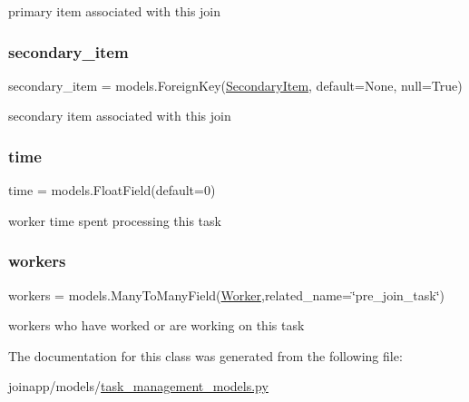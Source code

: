 primary item associated with this join 

\mbox{\label{classjoinapp_1_1models_1_1task__management__models_1_1_p_j_f_task_a0a9178a9cf48b964cab2025b9788a615}} 
\subsubsection{\texorpdfstring{secondary\_item}{secondary\_item}}
{\footnotesize\ttfamily secondary\+\_\+item = models.\+Foreign\+Key(\textquotesingle{}\mbox{\hyperlink{classjoinapp_1_1models_1_1items_1_1_secondary_item}{Secondary\+Item}}\textquotesingle{}, default=None, null=True)\hspace{0.3cm}{\ttfamily [static]}}



secondary item associated with this join 

\mbox{\label{classjoinapp_1_1models_1_1task__management__models_1_1_p_j_f_task_a70c092a6aebace0b1ea406e14da78a40}} 
\subsubsection{\texorpdfstring{time}{time}}
{\footnotesize\ttfamily time = models.\+Float\+Field(default=0)\hspace{0.3cm}{\ttfamily [static]}}



worker time spent processing this task 

\mbox{\label{classjoinapp_1_1models_1_1task__management__models_1_1_p_j_f_task_a42a0cd7f4a34b940f08fd182458c9aba}} 
\subsubsection{\texorpdfstring{workers}{workers}}
{\footnotesize\ttfamily workers = models.\+Many\+To\+Many\+Field(\mbox{\hyperlink{classjoinapp_1_1models_1_1task__management__models_1_1_worker}{Worker}},related\+\_\+name=\char`\"{}pre\+\_\+join\+\_\+task\char`\"{})\hspace{0.3cm}{\ttfamily [static]}}



workers who have worked or are working on this task 



The documentation for this class was generated from the following file\+:\begin{DoxyCompactItemize}
\item 
joinapp/models/\mbox{\hyperlink{task__management__models_8py}{task\+\_\+management\+\_\+models.\+py}}\end{DoxyCompactItemize}
